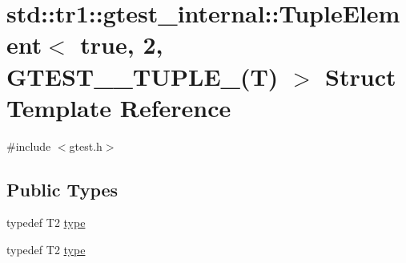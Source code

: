 \hypertarget{structstd_1_1tr1_1_1gtest__internal_1_1_tuple_element_3_01true_00_012_00_01_g_t_e_s_t__10___t_u_p_l_e___07_t_08_01_4}{\section{std\-:\-:tr1\-:\-:gtest\-\_\-internal\-:\-:Tuple\-Element$<$ true, 2, G\-T\-E\-S\-T\-\_\-\_\-\-T\-U\-P\-L\-E\-\_\-(T) $>$ Struct Template Reference}
\label{structstd_1_1tr1_1_1gtest__internal_1_1_tuple_element_3_01true_00_012_00_01_g_t_e_s_t__10___t_u_p_l_e___07_t_08_01_4}
}


{\ttfamily \#include $<$gtest.\-h$>$}

\subsection*{Public Types}
\begin{DoxyCompactItemize}
\item 
typedef T2 \hyperlink{structstd_1_1tr1_1_1gtest__internal_1_1_tuple_element_3_01true_00_012_00_01_g_t_e_s_t__10___t_u_p_l_e___07_t_08_01_4_a2162d0e4f4c93fb1fdedb1938b844fbe}{type}
\item 
typedef T2 \hyperlink{structstd_1_1tr1_1_1gtest__internal_1_1_tuple_element_3_01true_00_012_00_01_g_t_e_s_t__10___t_u_p_l_e___07_t_08_01_4_a2162d0e4f4c93fb1fdedb1938b844fbe}{type}
\end{DoxyCompactItemize}


